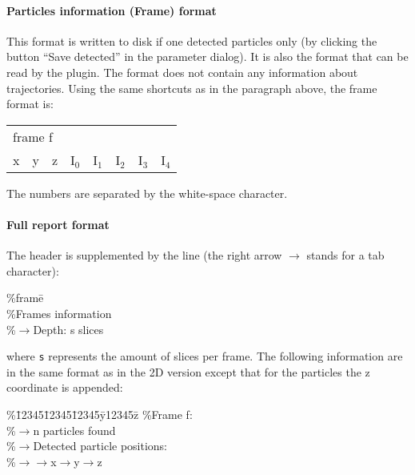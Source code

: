 \documentclass{scrartcl}
\begin{document}
\paragraph{Particles information (Frame) format}
This format is written to disk if one detected particles only (by clicking the button ``Save detected'' in the parameter dialog). It is also the format that can be read by the plugin. The format does not contain any information about trajectories. Using the same shortcuts as in the paragraph above, the frame format is:
\begin{flushleft}
\begin{table}[h]		
		\ttfamily
		\begin{tabular}{*{8}{l}}	
			\multicolumn{5}{l}{frame f} \\		
			x & y & z & I$_0$ & I$_1$ & I$_2$ & I$_3$ & I$_4$ 
		\end{tabular}
\end{table}
\end{flushleft}
The numbers are separated by the white-space character.
\paragraph{Full report format}
The header is supplemented by the line (the right arrow $\rightarrow$ stands for a tab character): 
\begin{flushleft}
\ttfamily
\begin{tabbing}
\%frame\= \kill \\
\%Frames information \\
\%$\rightarrow$\>Depth: s slices
\end{tabbing}
\end{flushleft}
where \texttt{s} represents the amount of slices per frame. 
The following information are in the same format as in the 2D version except that for the particles the z coordinate is appended:
\begin{flushleft}
\ttfamily
\begin{tabbing}
\%\=12345\=12345\=12345\=y12345\=z \kill
\%\>Frame f:\\
\%\>$\rightarrow$\>n particles found\\
\%\>$\rightarrow$\>Detected particle positions: \\
\%\>$\rightarrow$\>$\rightarrow$\>x$\rightarrow$\>y$\rightarrow$\>z
\end{tabbing}
\end{flushleft}
\end{document}
